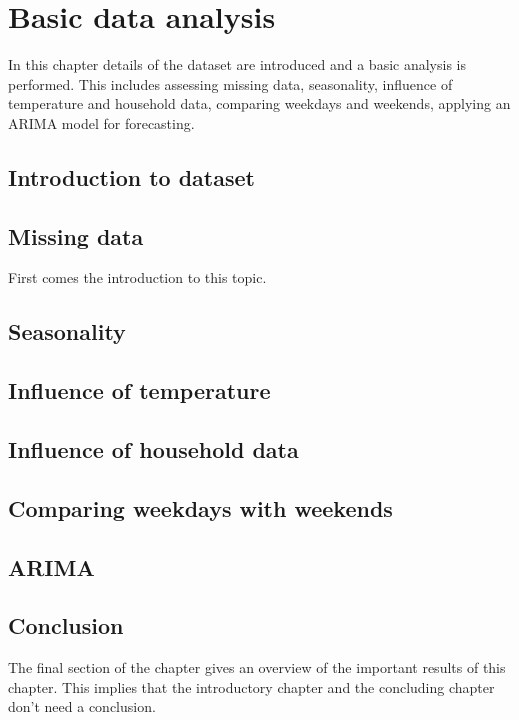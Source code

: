 \chapter{Basic data analysis}
\label{cha:1}
In this chapter details of the dataset are introduced and a basic analysis is performed. This includes assessing missing data, seasonality,  influence of temperature and household data, comparing weekdays and weekends, applying an ARIMA model for forecasting.


\section{Introduction to dataset}


\section{Missing data}
First comes the introduction to this topic.

\section{Seasonality}


\section{Influence of temperature}


\section{Influence of household data}


\section{Comparing weekdays with weekends}


\section{ARIMA}


\section{Conclusion}
The final section of the chapter gives an overview of the important results
of this chapter. This implies that the introductory chapter and the
concluding chapter don't need a conclusion.




